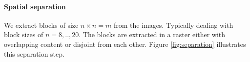 \paragraph{Spatial separation}
We extract blocks of size $n \times n=m$ from the images. Typically dealing with
block sizes of $n=8,..,20$. The blocks are extracted in a raster either with
overlapping content or disjoint from each other. Figure \ref{fig:separation}
illustrates this separation step. 
\begin{figure}[h]
\centering
{}
\hspace{5mm}
\subfloat[]{\includegraphics[scale =
}
\end{figure}
